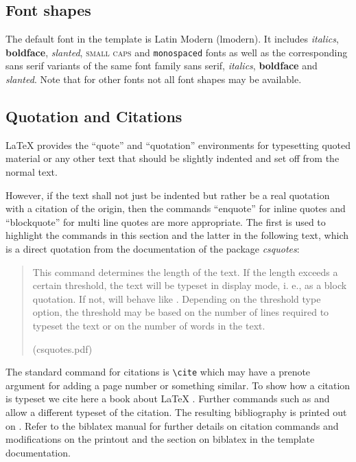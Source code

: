 \subsection{Font shapes}
\label{sec:example:FontShapes}

The default font in the template is Latin Modern (lmodern). It includes \textit{italics}, \textbf{boldface}, \textsl{slanted}, \textsc{small caps} and \texttt{monospaced} fonts as well as the corresponding sans serif variants  of the same font family \textsf{sans serif}, \textsf{\textit{italics}}, \textsf{\textbf{boldface}} and \textsf{\textsl{slanted}}. Note that for other fonts not all font shapes may be available. 

\subsection{Quotation and Citations}
\label{sec:example:QuoteCite}
%
LaTeX provides the \enquote{quote} and \enquote{quotation} environments for typesetting quoted material or any other text that should be slightly indented 
and set off from the normal text.

However, if the text shall not just be indented but rather be a real quotation with a citation of the origin, then the commands \enquote{enquote} for inline quotes and \enquote{blockquote} for multi line quotes are more appropriate. The first is used to highlight the commands in this section and the latter in the following text, which is a direct quotation from the documentation of the package
 \emph{csquotes}: 
%
\blockquote[(csquotes.pdf)]{This command determines the length of the text. 
If the length exceeds a certain threshold, the text will be 
typeset in display mode, i. e., as a block quotation. 
If not,  will behave like . 
Depending on the threshold type option, the threshold may be based on the number
of lines required to typeset the text or on the number of words in the text.}

The standard command for citations is \texttt{\textbackslash{}cite} which may have a prenote argument for adding a page number or something similar. To show how a citation is typeset we cite here a book about LaTeX \cite[59]{companion}. Further commands such as  \parencite{companion} and  \textcite{companion} allow a different typeset of the citation. The resulting bibliography is printed out on . Refer to the biblatex manual for further details on citation commands and modifications on the printout and the section on biblatex in the template documentation.

